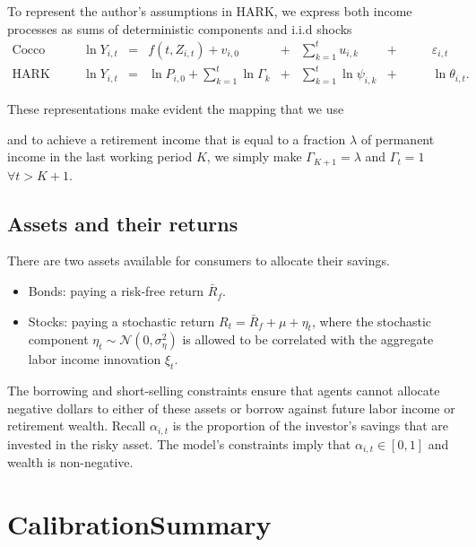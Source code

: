 \documentclass[./CGMPort.tex]{subfiles}
\begin{document}
To represent the author's assumptions in HARK, we express both income processes as sums of deterministic components and i.i.d shocks
\begin{align}
\text{Cocco et. al} &\quad& \ln Y_{i,t} &=& f(t,Z_{i,t}) + v_{i,0} &+&\sum_{k=1}^t u_{i,k} &+&\qquad \varepsilon_{i,t} \\
\text{HARK}        &\quad& \ln Y_{i,t} &=& \ln P_{i,0} + \sum_{k=1}^t \ln \Gamma_k &+&\sum_{k=1}^t \ln \psi_{i,k} &+& \qquad \ln \theta_{i,t}.
\end{align}

These representations make evident the mapping that we use



and to achieve a retirement income that is equal to a fraction $\lambda$ of permanent income in the last working period $K$, we simply make $\Gamma_{K+1} = \lambda$ and $\Gamma_{t} = 1$ $\forall t>K+1$.

\subsection{Assets and their returns}

There are two assets available for consumers to allocate their savings.
\begin{itemize}
	\item Bonds: paying a risk-free return $\bar{R}_f$.

	\item Stocks: paying a stochastic return $R_t = \bar{R}_f + \mu + \eta_t$, where the stochastic component $\eta_t \sim \mathcal{N}(0, \sigma^2_\eta)$ is allowed to be correlated with the aggregate labor income innovation $\xi_t$.
	
\end{itemize}

The borrowing and short-selling constraints ensure that agents cannot allocate negative dollars to either of these assets or borrow against future labor income or retirement wealth. Recall $\alpha_{i,t}$ is the proportion of the investor's savings that are invested in the risky asset. The model's constraints imply that $\alpha_{i,t}\in[0,1]$ and wealth is non-negative.

\hypertarget{Calibration}{}
\section{Calibration\textemdash Summary}
\end{document}
